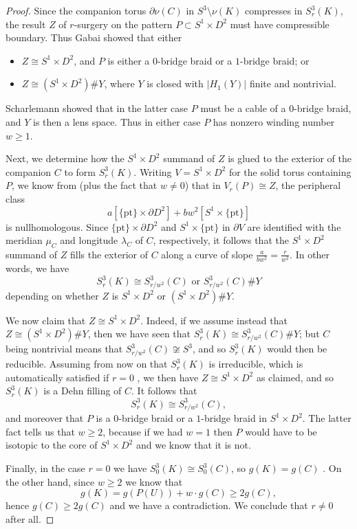 \documentclass[11pt]{amsart}
\numberwithin{equation}{section}
\numberwithin{theorem}{section}
\theoremstyle{definition}
\newcommand{\pt}{\mathrm{pt}}
\begin{document}
\begin{proof}
Since the companion torus $\partial \nu(C)$ in $S^3 \setminus \nu(K)$ compresses in $S^3_r(K)$, the result $Z$ of $r$-surgery on the pattern $P \subset S^1\times D^2$ must have compressible boundary.  Thus Gabai \cite[Theorem~1.1]{gabai-solid-tori} showed that either
\begin{itemize}
\item $Z \cong S^1\times D^2$, and $P$ is either a $0$-bridge braid or a $1$-bridge braid; or
\item $Z \cong (S^1\times D^2) \# Y$, where $Y$ is closed with $|H_1(Y)|$ finite and nontrivial.
\end{itemize}
Scharlemann \cite{scharlemann-reducible} showed that in the latter case $P$ must be a cable of a $0$-bridge braid, and $Y$ is then a lens space.  Thus in either case $P$ has nonzero winding number $w \geq 1$.

Next, we determine how the $S^1\times D^2$ summand of $Z$ is glued to the exterior of the companion $C$ to form $S^3_r(K)$.  Writing $V = S^1\times D^2$ for the solid torus containing $P$, we know from \cite[Lemma~3.3]{gordon} (plus the fact that $w \neq 0$) that in $V_r(P) \cong Z$, the peripheral class
\[ a[\{\pt\} \times \partial D^2] + bw^2[S^1\times \{\pt\}] \]
is nullhomologous.  Since $\{\pt\}\times \partial D^2$ and $S^1\times \{\pt\}$ in $\partial V$ are identified with the meridian $\mu_C$ and longitude $\lambda_C$ of $C$, respectively, it follows that the $S^1\times D^2$ summand of $Z$ fills the exterior of $C$ along a curve of slope $\frac{a}{bw^2} = \frac{r}{w^2}$.  In other words, we have
\[ S^3_r(K) \cong S^3_{r/w^2}(C) \text{ or } S^3_{r/w^2}(C) \# Y \]
depending on whether $Z$ is $S^1\times D^2$ or $(S^1\times D^2) \# Y$.

We now claim that $Z \cong S^1\times D^2$.  Indeed, if we assume instead that $Z \cong (S^1\times D^2) \# Y$, then we have seen that $S^3_r(K) \cong S^3_{r/w^2}(C) \# Y$; but $C$ being nontrivial means that $S^3_{r/w^2}(C) \not\cong S^3$, and so $S^3_r(K)$ would then be reducible.  Assuming from now on that $S^3_r(K)$ is irreducible, which is automatically satisfied if $r=0$ \cite{gabai-foliations3}, we then have $Z \cong S^1\times D^2$ as claimed, and so $S^3_r(K)$ is a Dehn filling of $C$.  It follows that
\[ S^3_r(K) \cong S^3_{r/w^2}(C), \]
and moreover that $P$ is a $0$-bridge braid or a $1$-bridge braid in $S^1\times D^2$.  The latter fact tells us that $w \geq 2$, because if we had $w=1$ then $P$ would have to be isotopic to the core of $S^1\times D^2$ and we know that it is not.

Finally, in the case $r=0$ we have $S^3_0(K) \cong S^3_0(C)$, so $g(K)=g(C)$ \cite{gabai-foliations3}.  On the other hand, since $w\geq 2$ we know that
\[ g(K) = g(P(U)) + w\cdot g(C) \geq 2g(C), \]
hence $g(C) \geq 2g(C)$ and we have a contradiction.  We conclude that $r \neq 0$ after all.
\end{proof}
\end{document}
